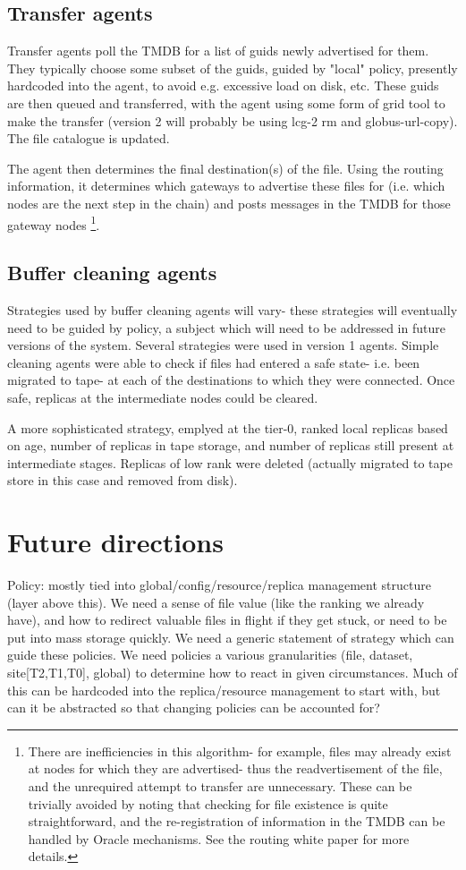 \documentclass{cmspaper}
\begin{document}
\subsection{Transfer agents}
Transfer agents poll the TMDB for a list of guids newly advertised for them. They typically choose some subset of the guids, guided by "local" policy, presently hardcoded into the agent, to avoid e.g. excessive load on disk, etc. These guids are then queued and transferred, with the agent using some form of grid tool to make the transfer (version 2 will probably be using lcg-2 rm and globus-url-copy). The file catalogue is updated.

The agent then determines the final destination(s) of the file. Using the routing information, it determines which gateways to advertise these files for (i.e. which nodes are the next step in the chain) and posts messages in the TMDB for those gateway nodes \footnote{There are inefficiencies in this algorithm- for example, files may already exist at nodes for which they are advertised- thus the readvertisement of the file, and the unrequired attempt to transfer are unnecessary. These can be trivially avoided by noting that checking for file existence is quite straightforward, and the re-registration of information in the TMDB can be handled by Oracle mechanisms. See the routing white paper for more details.}.

\subsection{Buffer cleaning agents}
Strategies used by buffer cleaning agents will vary- these strategies will eventually need to be guided by policy, a subject which will need to be addressed in future versions of the system. Several strategies were used in version 1 agents. Simple cleaning agents were able to check if files had entered a safe state- i.e. been migrated to tape- at each of the destinations to which they were connected. Once safe, replicas at the intermediate nodes
could be cleared.

A more sophisticated strategy, emplyed at the tier-0, ranked local replicas based on age, number of replicas in tape storage, and number of replicas still present at intermediate stages. Replicas of low rank were deleted (actually migrated to tape store in this case and removed from disk).

\section{Future directions}
Policy: mostly tied into global/config/resource/replica management structure (layer above this). We need a sense of file value (like the ranking we already have), and how to redirect valuable files in flight if they get stuck, or need to be put into mass storage quickly. We need a generic statement of strategy which can guide these policies. We need policies a various granularities (file, dataset, site[T2,T1,T0], global) to determine how to react in given circumstances. Much of this can be hardcoded into the replica/resource management to start with, but can it be abstracted so that changing policies can be accounted for?
\end{document}
